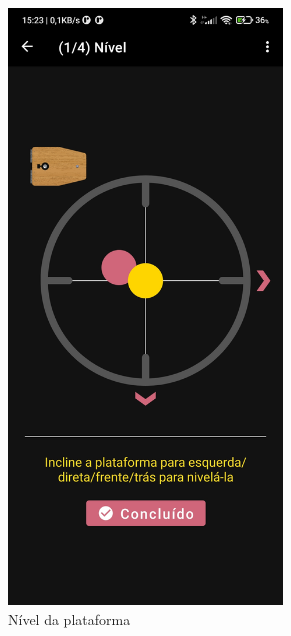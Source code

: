 \begin{figure}[!htb]
	\centering
	\caption{Telas de Alinhamento}
	\label{endalignment}
	\begin{subfigure}[b]{0.3\textwidth}
		\centering
		\includegraphics[width=0.8\textwidth]{figuras/desAplicativo/nivel}
		\caption{Nível da plataforma}
		\label{nivelplataforma}
	\end{subfigure}
	\hfill
	\begin{subfigure}[b]{0.3\textwidth}
		\centering

\end{subfigure}
\end{figure}
